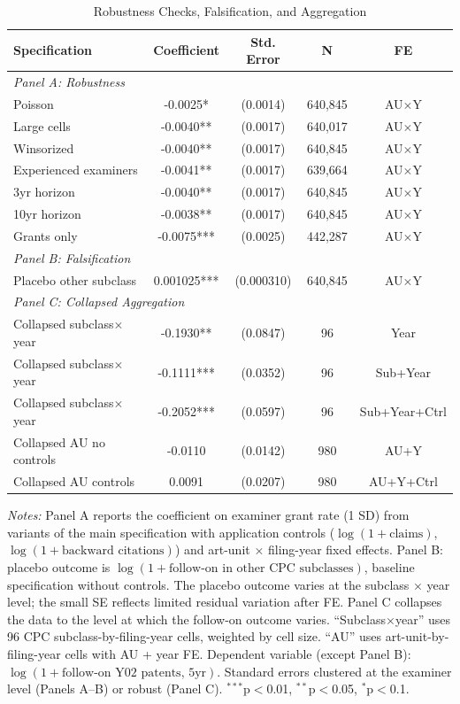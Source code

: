\begin{table}[htbp]
\centering
\caption{Robustness Checks, Falsification, and Aggregation}
\label{tab:robust}
\begin{tabular}{lcccc}
\hline\hline
Specification & Coefficient & Std. Error & N & FE \\
\hline
\multicolumn{5}{l}{\textit{Panel A: Robustness}} \\
Poisson & -0.0025* & (0.0014) & 640,845 & AU$\times$Y \\
Large cells & -0.0040** & (0.0017) & 640,017 & AU$\times$Y \\
Winsorized & -0.0040** & (0.0017) & 640,845 & AU$\times$Y \\
Experienced examiners & -0.0041** & (0.0017) & 639,664 & AU$\times$Y \\
3yr horizon & -0.0040** & (0.0017) & 640,845 & AU$\times$Y \\
10yr horizon & -0.0038** & (0.0017) & 640,845 & AU$\times$Y \\
Grants only & -0.0075*** & (0.0025) & 442,287 & AU$\times$Y \\
\hline
\multicolumn{5}{l}{\textit{Panel B: Falsification}} \\
Placebo other subclass & 0.001025*** & (0.000310) & 640,845 & AU$\times$Y \\
\hline
\multicolumn{5}{l}{\textit{Panel C: Collapsed Aggregation}} \\
Collapsed subclass$\times$year & -0.1930** & (0.0847) & 96 & Year \\
Collapsed subclass$\times$year & -0.1111*** & (0.0352) & 96 & Sub+Year \\
Collapsed subclass$\times$year & -0.2052*** & (0.0597) & 96 & Sub+Year+Ctrl \\
Collapsed AU no controls & -0.0110 & (0.0142) & 980 & AU+Y \\
Collapsed AU controls & 0.0091 & (0.0207) & 980 & AU+Y+Ctrl \\
\hline\hline
\end{tabular}
\begin{minipage}{0.95\textwidth}
\footnotesize
\textit{Notes:} Panel A reports the coefficient on examiner grant rate (1 SD) from variants of the main specification with application controls ($\log(1 + \text{claims})$, $\log(1 + \text{backward citations})$) and art-unit $\times$ filing-year fixed effects. Panel B: placebo outcome is $\log(1 + \text{follow-on in other CPC subclasses})$, baseline specification without controls. The placebo outcome varies at the subclass $\times$ year level; the small SE reflects limited residual variation after FE. Panel C collapses the data to the level at which the follow-on outcome varies. ``Subclass$\times$year'' uses 96 CPC subclass-by-filing-year cells, weighted by cell size. ``AU'' uses art-unit-by-filing-year cells with AU + year FE. Dependent variable (except Panel B): $\log(1 + \text{follow-on Y02 patents, 5yr})$. Standard errors clustered at the examiner level (Panels A--B) or robust (Panel C).
$^{***}$p$<$0.01, $^{**}$p$<$0.05, $^{*}$p$<$0.1.
\end{minipage}
\end{table}
